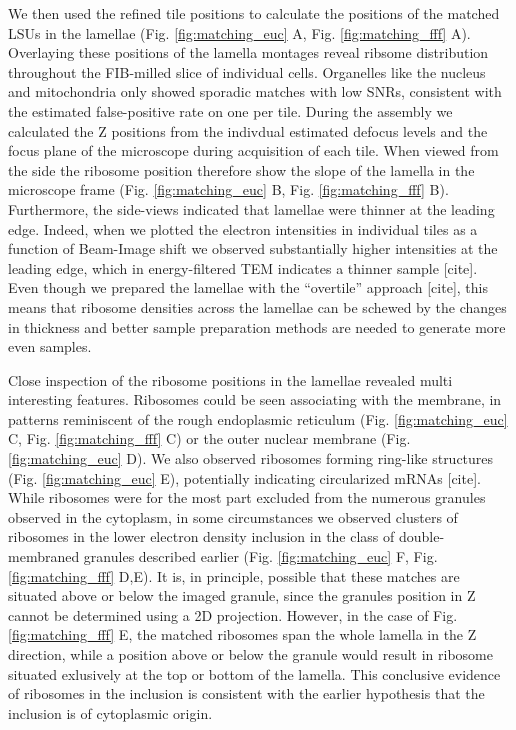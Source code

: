 \documentclass[
]{article}
\begin{document}
We then used the refined tile positions to calculate the positions of the
matched LSUs in the lamellae (Fig. \ref{fig:matching_euc} A, Fig.
\ref{fig:matching_fff} A). Overlaying these positions of the lamella montages
reveal ribsome distribution throughout the FIB-milled slice of individual cells.
Organelles like the nucleus and mitochondria only showed sporadic matches with
low SNRs, consistent with the estimated false-positive rate on one per tile.
During the assembly we calculated the Z positions from the indivdual estimated
defocus levels and the focus plane of the microscope during acquisition of each
tile. When viewed from the side the ribosome position therefore show the slope
of the lamella in the microscope frame (Fig. \ref{fig:matching_euc} B, Fig.
\ref{fig:matching_fff} B). Furthermore, the side-views indicated that lamellae were
thinner at the leading edge. Indeed, when we plotted the electron intensities in
individual tiles as a function of Beam-Image shift we observed substantially
higher intensities at the leading edge, which in energy-filtered TEM indicates a
thinner sample {[}cite{]}. Even though we prepared the lamellae with the ``overtile''
approach {[}cite{]}, this means that ribosome densities across the lamellae can be
schewed by the changes in thickness and better sample preparation methods are
needed to generate more even samples.

Close inspection of the ribosome positions in the lamellae revealed multi
interesting features. Ribosomes could be seen associating with the membrane, in
patterns reminiscent of the rough endoplasmic reticulum (Fig.
\ref{fig:matching_euc} C, Fig. \ref{fig:matching_fff} C) or the outer nuclear membrane
(Fig. \ref{fig:matching_euc} D). We also observed ribosomes forming ring-like
structures (Fig. \ref{fig:matching_euc} E), potentially indicating circularized
mRNAs {[}cite{]}. While ribosomes were for the most part excluded from the numerous
granules observed in the cytoplasm, in some circumstances we observed clusters
of ribosomes in the lower electron density inclusion in the class of
double-membraned granules described earlier (Fig. \ref{fig:matching_euc} F, Fig.
\ref{fig:matching_fff} D,E). It is, in principle, possible that these matches are
situated above or below the imaged granule, since the granules position in Z
cannot be determined using a 2D projection. However, in the case of Fig.
\ref{fig:matching_fff} E, the matched ribosomes span the whole lamella in the Z
direction, while a position above or below the granule would result in ribosome
situated exlusively at the top or bottom of the lamella. This conclusive
evidence of ribosomes in the inclusion is consistent with the earlier hypothesis
that the inclusion is of cytoplasmic origin.
\end{document}
